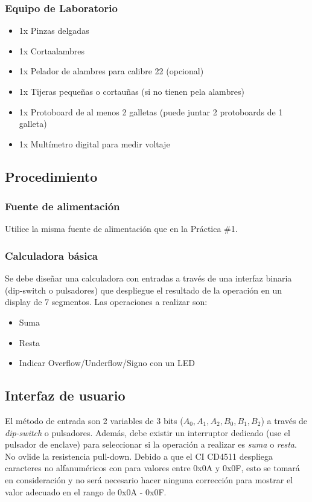 \subsubsection*{Equipo de Laboratorio}
\begin{itemize}
    \item 1x Pinzas delgadas
    \item 1x Cortaalambres
    \item 1x Pelador de alambres para calibre 22 (opcional)
    \item 1x Tijeras pequeñas o cortauñas (si no tienen pela alambres)
    \item 1x Protoboard de al menos 2 galletas (puede juntar 2 protoboards de 1 galleta)
    \item 1x Multímetro digital para medir voltaje
\end{itemize}

\subsection{Procedimiento}
\subsubsection{Fuente de alimentación}
Utilice la misma fuente de alimentación que en la Práctica \#1.

\subsubsection{Calculadora básica}
Se debe diseñar una calculadora con entradas a través de una interfaz binaria (dip-switch o pulsadores) que despliegue el resultado de la
operación en un display de 7 segmentos. Las operaciones a realizar son:
\begin{itemize}
    \item Suma 
    \item Resta
    \item Indicar Overflow/Underflow/Signo con un LED
\end{itemize}

\vspace{14pt}


\subsection{Interfaz de usuario}
El método de entrada son 2 variables de 3 bits ($A_0, A_1, A_2, B_0, B_1, B_2$) a través de \emph{dip-switch} o pulsadores. Además, debe existir
un interruptor dedicado (use el pulsador de enclave) para seleccionar si la operación a realizar es \emph{suma} o \emph{resta}. No ovlide la resistencia pull-down.
Debido a que el CI CD4511 despliega caracteres no alfanuméricos con para valores entre 0x0A y 0x0F, esto se tomará en consideración y 
no será necesario hacer ninguna corrección para mostrar el valor adecuado en el rango de 0x0A - 0x0F.

